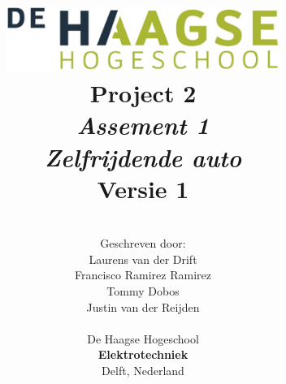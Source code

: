 \title{
\includegraphics[width=3.5in]{Media/Figuren/HHS.png} \\
\vspace*{2in}
\textbf{Project 2}\\
\textit{Assement 1}\\
\textit{Zelfrijdende auto}\\
Versie 1
}
\author{
\vspace*{2.5in} \\
  Geschreven door:\\
  Laurens van der Drift\\
  Francisco Ramirez Ramirez\\
  Tommy Dobos\\
  Justin van der Reijden\\
		\vspace*{0.5in} \\
		De Haagse Hogeschool\\
        \textbf{Elektrotechniek}\\
        Delft, Nederland
       } 